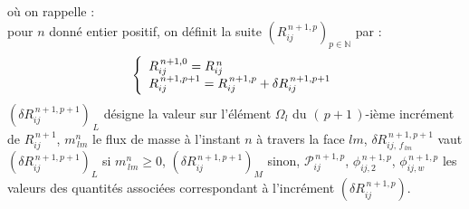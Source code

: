 o\`u on rappelle :\\
pour $n$ donn\'e entier positif, on d\'efinit la suite
 $({R}_{ij}^{\,n+1,p})_{p \in \mathbb{N}}$
 par :
\begin{equation}\notag
\left\{\begin{array}{l}
{R}_{ij}^{\,n+1,0} = {R}_{ij}^{\,n}\\
{R}_{ij}^{\,n+1,p+1} = {R}_{ij}^{\,n+1,p} + \delta{R}_{ij}^{\,n+1,p+1} \\
\end{array}\right.
\end{equation}
$(\delta{R}_{ij}^{\,n+1,p+1})_{\,L}$ d\'esigne la valeur sur l'\'el\'ement
$\Omega_l$ du $\text{$(\,p+1\,)$-i\`eme}$ incr\'ement de ${R}_{ij}^{\,n+1}$,
$ m^n_{\,lm}$ le flux de masse \`a l'instant $n$ \`a travers la face $lm$,
$\delta R_{ij,\,f_{\,lm}}^{\,n+1,p+1}$ vaut $({\delta
R}_{ij}^{\,n+1,p+1})_{L}$  si $ m^n_{\,lm} \geqslant 0$, $({\delta
R}_{ij}^{\,n+1,p+1})_{M}$ sinon,
$\mathcal{P}^{\,n+1,p}_{ij}$, $\phi^{\,n+1,p}_{ij,2}$, $\phi^{\,n+1,p}_{ij,w}$ les valeurs
des quantit\'es associ\'ees correspondant \`a l'incr\'ement
$(\delta{R}_{ij}^{\,n+1,p})$.\\



